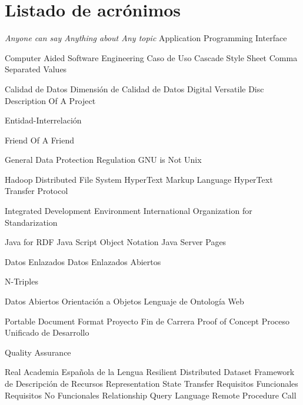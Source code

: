\chapter{Listado de acrónimos}
{\small
\begin{acronym}[XXXXXXXX]
       {\textit{Anyone can say Anything about Any topic}}
       {Application Programming Interface}

      {Computer Aided Software Engineering}
       {Caso de Uso}
       {Cascade Style Sheet}
       {Comma Separated Values}

        {Calidad de Datos}
       {Dimensión de Calidad de Datos}
       {Digital Versatile Disc}
      {Description Of A Project}

        {Entidad-Interrelación}

      {Friend Of A Friend}

      {General Data Protection Regulation}
       {\acs{GNU} is Not Unix}

      {Hadoop Distributed File System}
      {HyperText Markup Language}
      {HyperText Transfer Protocol}

       {Integrated Development Environment}
       {International Organization for Standarization}

      {Java for \acs{RDF}}
      {Java Script Object Notation}
       {Java Server Pages}

        {Datos Enlazados}
       {Datos Enlazados Abiertos}

        {N-Triples}

        {Datos Abiertos}
        {Orientación a Objetos}
       {Lenguaje de Ontología Web}

       {Portable Document Format}
       {Proyecto Fin de Carrera}
       {Proof of Concept}
       {Proceso Unificado de Desarrollo}

        {Quality Assurance}

       {Real Academia Española de la Lengua}
       {Resilient Distributed Dataset}
       {Framework de Descripción de Recursos}
      {Representation State Transfer}
        {Requisitos Funcionales}
       {Requisitos No Funcionales}
       {Relationship Query Language}
       {Remote Procedure Call}


\end{acronym}}

